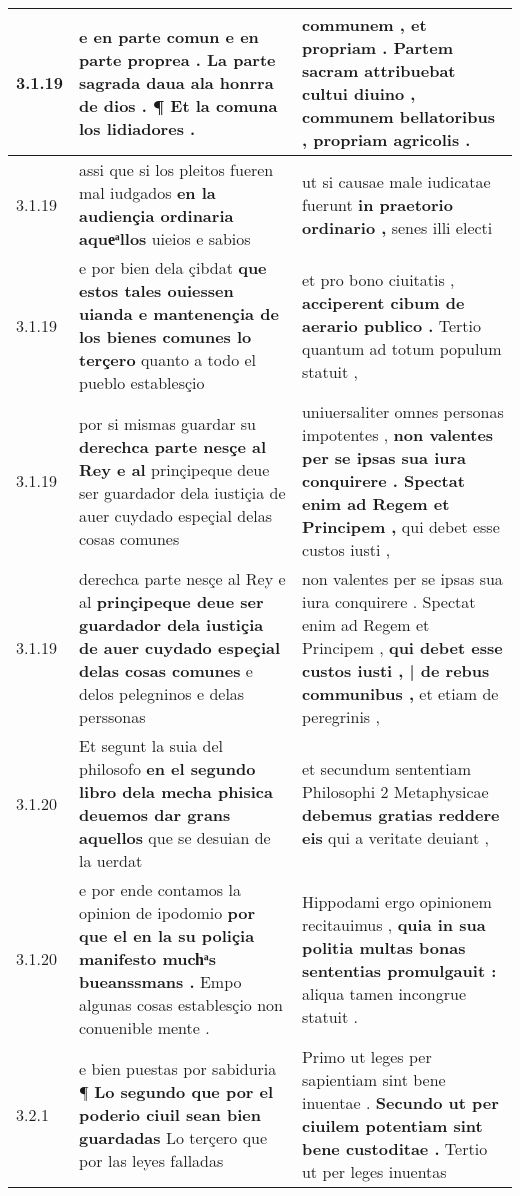 \begin{tabular}{|p{1cm}|p{6.5cm}|p{6.5cm}|}
3.1.19 & e en parte comun e en parte proprea . \textbf{ La parte sagrada daua ala honrra de dios . } ¶ Et la comuna los lidiadores . & communem , et propriam . \textbf{ Partem sacram attribuebat cultui diuino , } communem bellatoribus , propriam agricolis . \\\hline
3.1.19 & assi que si los pleitos fueren mal iudgados \textbf{ en la audiençia ordinaria aqueͣllos } uieios e sabios & ut si causae male iudicatae fuerunt \textbf{ in praetorio ordinario , } senes illi electi \\\hline
3.1.19 & e por bien dela çibdat \textbf{ que estos tales ouiessen uianda e mantenençia de los bienes comunes lo terçero } quanto a todo el pueblo establesçio & et pro bono ciuitatis , \textbf{ acciperent cibum de aerario publico . } Tertio quantum ad totum populum statuit , \\\hline
3.1.19 & por si mismas guardar su \textbf{ derechca parte nesçe al Rey e al } prinçipeque deue ser guardador dela iustiçia de auer cuydado espeçial delas cosas comunes & uniuersaliter omnes personas impotentes , \textbf{ non valentes per se ipsas sua iura conquirere . Spectat enim ad Regem et Principem , } qui debet esse custos iusti , \\\hline
3.1.19 & derechca parte nesçe al Rey e al \textbf{ prinçipeque deue ser guardador dela iustiçia de auer cuydado espeçial delas cosas comunes } e delos pelegninos e delas perssonas & non valentes per se ipsas sua iura conquirere . Spectat enim ad Regem et Principem , \textbf{ qui debet esse custos iusti , | de rebus communibus , } et etiam de peregrinis , \\\hline
3.1.20 & Et segunt la suia del philosofo \textbf{ en el segundo libro dela mecha phisica deuemos dar grans aquellos } que se desuian de la uerdat & et secundum sententiam Philosophi 2 Metaphysicae \textbf{ debemus gratias reddere eis } qui a veritate deuiant , \\\hline
3.1.20 & e por ende contamos la opinion de ipodomio \textbf{ por que el en la su poliçia manifesto muchͣs bueanssmans . } Empo algunas cosas establesçio non conuenible mente . & Hippodami ergo opinionem recitauimus , \textbf{ quia in sua politia multas bonas sententias promulgauit : } aliqua tamen incongrue statuit . \\\hline
3.2.1 & e bien puestas por sabiduria ¶ \textbf{ Lo segundo que por el poderio ciuil sean bien guardadas } Lo terçero que por las leyes falladas & Primo ut leges per sapientiam sint bene inuentae . \textbf{ Secundo ut per ciuilem potentiam sint bene custoditae . } Tertio ut per leges inuentas \\\hline

\end{tabular}
